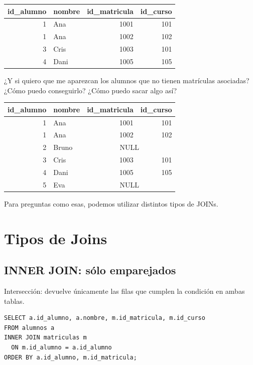 \documentclass[11pt,a4paper]{article}
\begin{document}
\begin{center}
\begin{tabular}{r l r r}
\toprule
id\_alumno & nombre & id\_matricula & id\_curso \\
\midrule
1 & Ana  & 1001 & 101 \\
1 & Ana  & 1002 & 102 \\
3 & Cris & 1003 & 101 \\
4 & Dani & 1005 & 105 \\
\bottomrule
\end{tabular}
\end{center}


¿Y si quiero que me aparezcan los alumnos que no tienen matrículas asociadas? ¿Cómo puedo conseguirlo?  ¿Cómo puedo sacar algo así?

\begin{center}
\begin{tabular}{r l r r}
\toprule
id\_alumno & nombre & id\_matricula & id\_curso \\
\midrule
1 & Ana   & 1001 & 101 \\
1 & Ana   & 1002 & 102 \\
2 & Bruno & \multicolumn{2}{c}{NULL} \\
3 & Cris  & 1003 & 101 \\
4 & Dani  & 1005 & 105 \\
5 & Eva   & \multicolumn{2}{c}{NULL} \\
\bottomrule
\end{tabular}
\end{center}

Para preguntas como esas, podemos utilizar distintos tipos de JOINs.

\section{Tipos de Joins}

\subsection{INNER JOIN: sólo emparejados}
\begin{tcolorbox}[title=Idea]
Intersección: devuelve únicamente las filas que cumplen la condición en ambas tablas.
\end{tcolorbox}

\begin{lstlisting}
SELECT a.id_alumno, a.nombre, m.id_matricula, m.id_curso
FROM alumnos a
INNER JOIN matriculas m
  ON m.id_alumno = a.id_alumno
ORDER BY a.id_alumno, m.id_matricula;
\end{lstlisting}
\end{document}
